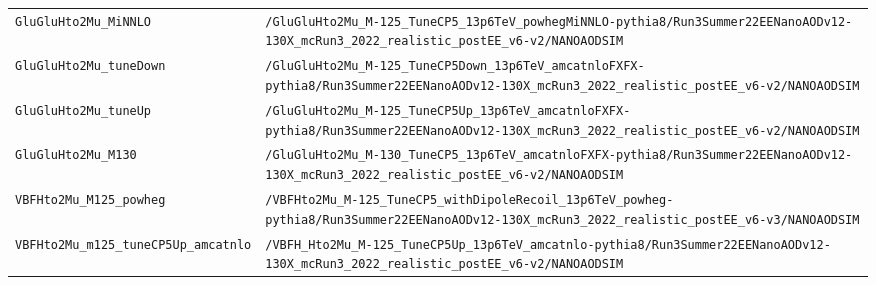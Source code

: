 \begin{longtable}{@{}>{\RaggedRight\arraybackslash}p{} >{\RaggedRight\arraybackslash}p{}@{}}
\addlinespace[2pt]
\texttt{GluGluHto2Mu\_\allowbreak{}MiNNLO} & \texttt{/\allowbreak{}GluGluHto2Mu\_\allowbreak{}M-\allowbreak{}125\_\allowbreak{}TuneCP5\_\allowbreak{}13p6TeV\_\allowbreak{}powhegMiNNLO-\allowbreak{}pythia8/\allowbreak{}Run3Summer22EENanoAODv12-\allowbreak{}130X\_\allowbreak{}mcRun3\_\allowbreak{}2022\_\allowbreak{}realistic\_\allowbreak{}postEE\_\allowbreak{}v6-\allowbreak{}v2/\allowbreak{}NANOAODSIM} \\
\addlinespace[2pt]
\texttt{GluGluHto2Mu\_\allowbreak{}tuneDown} & \texttt{/\allowbreak{}GluGluHto2Mu\_\allowbreak{}M-\allowbreak{}125\_\allowbreak{}TuneCP5Down\_\allowbreak{}13p6TeV\_\allowbreak{}amcatnloFXFX-\allowbreak{}pythia8/\allowbreak{}Run3Summer22EENanoAODv12-\allowbreak{}130X\_\allowbreak{}mcRun3\_\allowbreak{}2022\_\allowbreak{}realistic\_\allowbreak{}postEE\_\allowbreak{}v6-\allowbreak{}v2/\allowbreak{}NANOAODSIM} \\
\addlinespace[2pt]
\texttt{GluGluHto2Mu\_\allowbreak{}tuneUp} & \texttt{/\allowbreak{}GluGluHto2Mu\_\allowbreak{}M-\allowbreak{}125\_\allowbreak{}TuneCP5Up\_\allowbreak{}13p6TeV\_\allowbreak{}amcatnloFXFX-\allowbreak{}pythia8/\allowbreak{}Run3Summer22EENanoAODv12-\allowbreak{}130X\_\allowbreak{}mcRun3\_\allowbreak{}2022\_\allowbreak{}realistic\_\allowbreak{}postEE\_\allowbreak{}v6-\allowbreak{}v2/\allowbreak{}NANOAODSIM} \\
\addlinespace[2pt]
\texttt{GluGluHto2Mu\_\allowbreak{}M130} & \texttt{/\allowbreak{}GluGluHto2Mu\_\allowbreak{}M-\allowbreak{}130\_\allowbreak{}TuneCP5\_\allowbreak{}13p6TeV\_\allowbreak{}amcatnloFXFX-\allowbreak{}pythia8/\allowbreak{}Run3Summer22EENanoAODv12-\allowbreak{}130X\_\allowbreak{}mcRun3\_\allowbreak{}2022\_\allowbreak{}realistic\_\allowbreak{}postEE\_\allowbreak{}v6-\allowbreak{}v2/\allowbreak{}NANOAODSIM} \\
\addlinespace[2pt]
\texttt{VBFHto2Mu\_\allowbreak{}M125\_\allowbreak{}powheg} & \texttt{/\allowbreak{}VBFHto2Mu\_\allowbreak{}M-\allowbreak{}125\_\allowbreak{}TuneCP5\_\allowbreak{}withDipoleRecoil\_\allowbreak{}13p6TeV\_\allowbreak{}powheg-\allowbreak{}pythia8/\allowbreak{}Run3Summer22EENanoAODv12-\allowbreak{}130X\_\allowbreak{}mcRun3\_\allowbreak{}2022\_\allowbreak{}realistic\_\allowbreak{}postEE\_\allowbreak{}v6-\allowbreak{}v3/\allowbreak{}NANOAODSIM} \\
\addlinespace[2pt]
\texttt{VBFHto2Mu\_\allowbreak{}m125\_\allowbreak{}tuneCP5Up\_\allowbreak{}amcatnlo} & \texttt{/\allowbreak{}VBFH\_\allowbreak{}Hto2Mu\_\allowbreak{}M-\allowbreak{}125\_\allowbreak{}TuneCP5Up\_\allowbreak{}13p6TeV\_\allowbreak{}amcatnlo-\allowbreak{}pythia8/\allowbreak{}Run3Summer22EENanoAODv12-\allowbreak{}130X\_\allowbreak{}mcRun3\_\allowbreak{}2022\_\allowbreak{}realistic\_\allowbreak{}postEE\_\allowbreak{}v6-\allowbreak{}v2/\allowbreak{}NANOAODSIM} \\

\end{longtable}
